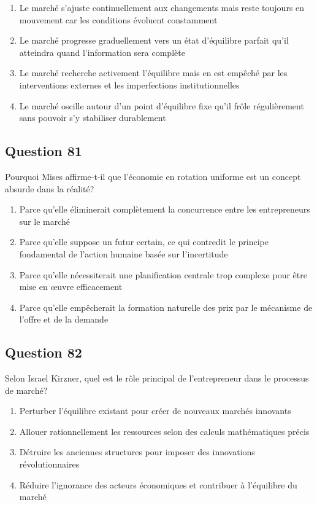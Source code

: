 \documentclass[12pt,a4paper]{article}
\begin{document}
\begin{enumerate}[label=\Alph*., leftmargin=*]
\item Le marché s'ajuste continuellement aux changements mais reste toujours en mouvement car les conditions évoluent constamment
\item Le marché progresse graduellement vers un état d'équilibre parfait qu'il atteindra quand l'information sera complète
\item Le marché recherche activement l'équilibre mais en est empêché par les interventions externes et les imperfections institutionnelles
\item Le marché oscille autour d'un point d'équilibre fixe qu'il frôle régulièrement sans pouvoir s'y stabiliser durablement
\end{enumerate}

\bigskip


\subsection*{Question 81}
Pourquoi Mises affirme-t-il que l'économie en rotation uniforme est un concept absurde dans la réalité?

\begin{enumerate}[label=\Alph*., leftmargin=*]
\item Parce qu'elle éliminerait complètement la concurrence entre les entrepreneurs sur le marché
\item Parce qu'elle suppose un futur certain, ce qui contredit le principe fondamental de l'action humaine basée sur l'incertitude
\item Parce qu'elle nécessiterait une planification centrale trop complexe pour être mise en œuvre efficacement
\item Parce qu'elle empêcherait la formation naturelle des prix par le mécanisme de l'offre et de la demande
\end{enumerate}

\bigskip


\subsection*{Question 82}
Selon Israel Kirzner, quel est le rôle principal de l'entrepreneur dans le processus de marché?

\begin{enumerate}[label=\Alph*., leftmargin=*]
\item Perturber l'équilibre existant pour créer de nouveaux marchés innovants
\item Allouer rationnellement les ressources selon des calculs mathématiques précis
\item Détruire les anciennes structures pour imposer des innovations révolutionnaires
\item Réduire l'ignorance des acteurs économiques et contribuer à l'équilibre du marché
\end{enumerate}
\end{document}
